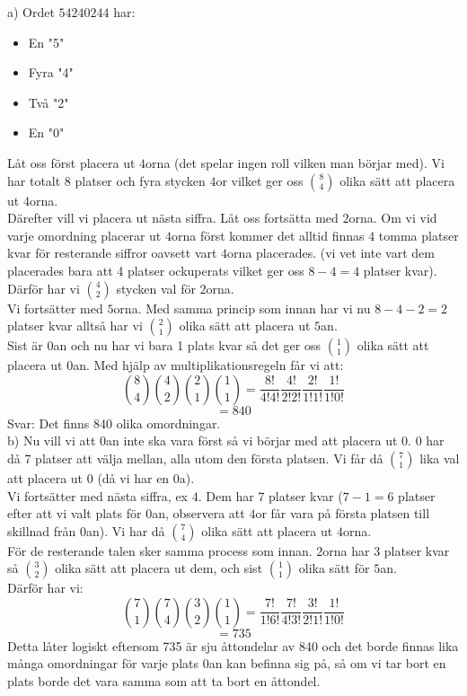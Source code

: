 \documentclass[nobib]{tufte-handout}
\begin{document}
\begin{xca}
a) Ordet $54240244$ har:
\begin{itemize}
  \item En "5"
  \item Fyra "4"
  \item Två "2"
  \item En "0"
\end{itemize}
Låt oss först placera ut $4$orna (det spelar ingen roll vilken man börjar med). Vi har totalt 8 platser och fyra stycken $4$or vilket ger oss $\binom{8}{4}$ olika sätt att placera ut $4$orna.\\
Därefter vill vi placera ut nästa siffra. Låt oss fortsätta med $2$orna. Om vi vid varje omordning placerar ut $4$orna först kommer det alltid finnas 4 tomma platser kvar för resterande siffror oavsett vart $4$orna placerades. (vi vet inte vart dem placerades bara att 4 platser ockuperats vilket ger oss $8-4=4$ platser kvar). Därför har vi $\binom{4}{2}$ stycken val för $2$orna.\\
Vi fortsätter med $5$orna. Med samma princip som innan har vi nu $8-4-2=2$ platser kvar alltså har vi $\binom{2}{1}$ olika sätt att placera ut $5$an.\\
Sist är $0$an och nu har vi bara 1 plats kvar så det ger oss $\binom{1}{1}$ olika sätt att placera ut $0$an. Med hjälp av multiplikationsregeln får vi att:
$$\binom{8}{4}\binom{4}{2}\binom{2}{1}\binom{1}{1}=\frac{8!}{4!4!}\frac{4!}{2!2!}\frac{2!}{1!1!}\frac{1!}{1!0!}$$
$$=840$$
Svar: Det finns 840 olika omordningar.\\
b) Nu vill vi att $0$an inte ska vara först så vi börjar med att placera ut $0$. $0$ har då 7 platser att välja mellan, alla utom den första platsen. Vi får då $\binom{7}{1}$ lika val att placera ut $0$ (då vi har en $0$a).\\
Vi fortsätter med nästa siffra, ex $4$. Dem har 7 platser kvar ($7-1=6$ platser efter att vi valt plats för $0$an, observera att  $4$or får vara på första platsen till skillnad från $0$an). Vi har  då $\binom{7}{4}$ olika sätt att placera ut $4$orna.\\
För de resterande talen sker samma process som innan. $2$orna har 3 platser kvar så $\binom{3}{2}$ olika sätt att placera ut dem, och sist $\binom{1}{1}$ olika sätt för $5$an.\\
Därför har vi:
$$\binom{7}{1}\binom{7}{4}\binom{3}{2}\binom{1}{1}=\frac{7!}{1!6!}\frac{7!}{4!3!}\frac{3!}{2!1!}\frac{1!}{1!0!}$$
$$=735$$
Detta låter logiskt eftersom 735 är sju åttondelar av 840 och det borde finnas lika många omordningar för varje plats 0an kan befinna sig på, så om vi tar bort en plats borde det vara samma som att ta bort en åttondel.
\end{xca}
\end{document}
